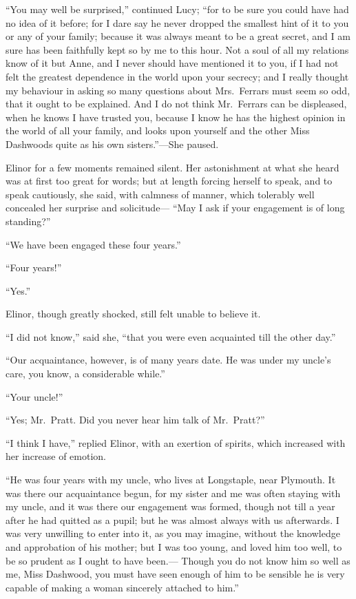 ``You may well be surprised,'' continued Lucy;
``for to be sure you could have had no idea of it before;
for I dare say he never dropped the smallest hint of it
to you or any of your family; because it was always meant
to be a great secret, and I am sure has been faithfully
kept so by me to this hour.  Not a soul of all my relations
know of it but Anne, and I never should have mentioned
it to you, if I had not felt the greatest dependence
in the world upon your secrecy; and I really thought my
behaviour in asking so many questions about Mrs.\ Ferrars
must seem so odd, that it ought to be explained.
And I do not think Mr.\ Ferrars can be displeased,
when he knows I have trusted you, because I know he has
the highest opinion in the world of all your family,
and looks upon yourself and the other Miss Dashwoods quite
as his own sisters.''---She paused.

Elinor for a few moments remained silent.
Her astonishment at what she heard was at first too
great for words; but at length forcing herself to speak,
and to speak cautiously, she said, with calmness of manner,
which tolerably well concealed her surprise and solicitude---%
``May I ask if your engagement is of long standing?''

``We have been engaged these four years.''

``Four years!''

``Yes.''

Elinor, though greatly shocked, still felt unable
to believe it.

``I did not know,'' said she, ``that you were even
acquainted till the other day.''

``Our acquaintance, however, is of many years date.
He was under my uncle's care, you know, a considerable while.''

``Your uncle!''

``Yes; Mr.\ Pratt.  Did you never hear him talk
of Mr.\ Pratt?''

``I think I have,'' replied Elinor, with an exertion
of spirits, which increased with her increase of emotion.

``He was four years with my uncle, who lives at Longstaple,
near Plymouth.  It was there our acquaintance begun,
for my sister and me was often staying with my uncle,
and it was there our engagement was formed, though not till
a year after he had quitted as a pupil; but he was almost
always with us afterwards.  I was very unwilling to enter
into it, as you may imagine, without the knowledge and
approbation of his mother; but I was too young, and loved
him too well, to be so prudent as I ought to have been.---%
Though you do not know him so well as me, Miss Dashwood,
you must have seen enough of him to be sensible he is
very capable of making a woman sincerely attached to him.''

